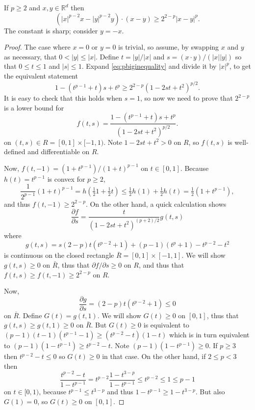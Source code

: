 \documentclass[final,onefignum]{siamart190516}
\newcommand\RR{\mathbb{R}}
\begin{document}
\begin{lemma}  \label{lem:pbiginequality}  If $p\ge 2$ and $x,y\in\RR^d$ then
\begin{equation}
\left(|x|^{p-2} x - |y|^{p-2} y\right)\cdot(x-y) \ge 2^{2-p} |x-y|^p. \label{eq:pbiginequality}
\end{equation}
The constant is sharp; consider $y=-x$.
\end{lemma}

\begin{proof}  The case where $x=0$ or $y=0$ is trivial, so assume, by swapping $x$ and $y$ as necessary, that $0 < |y| \le |x|$.  Define $t=|y|/|x|$ and $s = (x\cdot y)/(|x||y|)$ so that $0\le t \le 1$ and $|s|\le 1$.  Expand \eqref{eq:pbiginequality} and divide it by $|x|^p$, to get the equivalent statement
    $$1 - (t^{p-1}+t) s + t^p \ge 2^{2-p} \left(1 - 2 s t + t^2\right)^{p/2}.$$
It is easy to check that this holds when $s=1$, so now we need to prove that $2^{2-p}$ is a lower bound for
	$$f(t,s) = \frac{1 - (t^{p-1}+t) s + t^p}{\left(1 - 2 s t + t^2\right)^{p/2}}.$$
on $(t,s) \in R=[0,1]\times[-1,1)$.  Note $1-2st+t^2 > 0$ on $ R$, so $f(t,s)$ is well-defined and differentiable on $R$.

Now, $f(t,-1) = \left(1 + t^{p-1}\right) / \left(1 + t\right)^{p-1}$ on $t\in[0,1]$.  Because $h(t)=t^{p-1}$ is convex for $p \ge 2$,
    $$\frac{1}{2^{p-1}} (1+t)^{p-1} = h(\tfrac{1}{2} 1 + \tfrac{1}{2} t) \le \tfrac{1}{2} h(1) + \tfrac{1}{2} h(t) = \tfrac{1}{2} (1 + t^{p-1}),$$
and thus $f(t,-1) \ge 2^{2-p}$.  On the other hand, a quick calculation shows
    $$\frac{\partial f}{\partial s} = \frac{t}{\left(1 - 2 s t + t^2\right)^{(p+2)/2}} g(t,s)$$
where
    $$g(t,s) = s(2-p) t (t^{p-2} + 1) + (p-1) (t^p+1) - t^{p-2} - t^2$$
is continuous on the closed rectangle $\bar R = [0,1]\times[-1,1]$.  We will show $g(t,s)\ge 0$ on $\bar R$, thus that $\partial f/\partial s \ge 0$ on $R$, and thus that $f(t,s)\ge f(t,-1) \ge  2^{2-p}$ on $R$.

Now,
    $$\frac{\partial g}{\partial s} = (2-p) t (t^{p-2} + 1) \le 0$$
on $\bar R$.  Define $G(t) = g(t,1)$.  We will show $G(t)\ge 0$ on $[0,1]$, thus that $g(t,s)\ge g(t,1)\ge 0$ on $\bar R$.  But $G(t)\ge 0$ is equivalent to $(p-1) (t-1) (t^{p-1}-1) \ge (t^{p-2} - t) (1 - t)$ which is in turn equivalent to $(p-1) (1 - t^{p-1}) \ge t^{p-2} - t$.  Note $(p-1) (1 - t^{p-1}) \ge 0$.  If $p\ge 3$ then $t^{p-2} - t \le 0$ so $G(t)\ge 0$ in that case.  On the other hand, if $2\le p < 3$ then
	$$\frac{t^{p-2} - t}{1 - t^{p-1}} = t^{p-2} \frac{1 - t^{3-p}}{1 - t^{p-1}} \le t^{p-2} \le 1 \le p-1$$
on $t\in[0,1)$, because $t^{p-1}\le t^{3-p}$ and thus $1 - t^{p-1} \ge 1 - t^{3-p}$.  But also $G(1)=0$, so $G(t)\ge 0$ on $[0,1]$. \end{proof}
\end{document}
